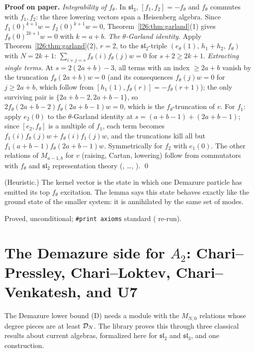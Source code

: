\textbf{Proof on paper.} \emph{Integrability of $f_\theta$.} In $\mathfrak{sl}_3$, $[f_1,f_2]=-f_\theta$ and $f_\theta$
commutes with $f_1,f_2$: the three lowering vectors span a Heisenberg algebra. Since $f_1(0)^{k+1}w=f_2(0)^{k+1}w=0$,
Theorem~\ref{l26:thm:garland}(1) gives $f_\theta(0)^{2k+1}w=0$ with $k=a+b$. \emph{The $\theta$-Garland identity.}
Apply Theorem~\ref{l26:thm:garland}(2), $r=2$, to the $\mathfrak{sl}_2$-triple $(e_\theta(1),\,h_1+h_2,\,f_\theta)$ with
$N=2k+1$: $\sum_{i+j=s}f_\theta(i)f_\theta(j)w=0$ for $s+2\ge2k+1$. \emph{Extracting single terms.} At $s=2(2a+b)-3$, all
terms with an index $\ge2a+b$ vanish by the truncation $f_\theta(2a+b)w=0$ (and its consequences $f_\theta(j)w=0$ for
$j\ge2a+b$, which follow from $[h_1(1),f_\theta(r)]=-f_\theta(r+1)$); the only surviving pair is $\{2a+b-2,2a+b-1\}$, so
$2f_\theta(2a+b-2)f_\theta(2a+b-1)w=0$, which is the $f_\theta$-truncation of $v$. For $f_1$: apply $e_2(0)$ to the
$\theta$-Garland identity at $s=(a+b-1)+(2a+b-1)$; since $[e_2,f_\theta]$ is a multiple of $f_1$, each term becomes
$f_1(i)f_\theta(j)w+f_\theta(i)f_1(j)w$, and the truncations kill all but $f_1(a+b-1)f_\theta(2a+b-1)w$. Symmetrically for $f_2$
with $e_1(0)$. The other relations of $M_{a-1,b}$ for $v$ (raising, Cartan, lowering) follow from commutators with
$f_\theta$ and $\mathfrak{sl}_2$ representation theory (, \dots, ). \qed

\begin{physics}
(Heuristic.) The kernel vector is the state in which one Demazure particle has emitted its top $f_\theta$ excitation. The lemma says
this state behaves exactly like the ground state of the smaller system: it is annihilated by the same set of modes.
\end{physics}

\begin{status}
Proved, unconditional; \texttt{\#print axioms} standard ( re-run).
\end{status}

\section[The Demazure side for $A_2$]{The Demazure side for $A_2$: Chari--Pressley, Chari--Loktev, Chari--Venkatesh, and U7}\label{l26:sec:u7}

The Demazure lower bound (D) needs a module with the $M_{N,0}$ relations whose degree pieces are at least
$\mathcal D_N$. The library proves this through three classical results about current algebras, formalized here for
$\mathfrak{sl}_2$ and $\mathfrak{sl}_3$, and one construction.


